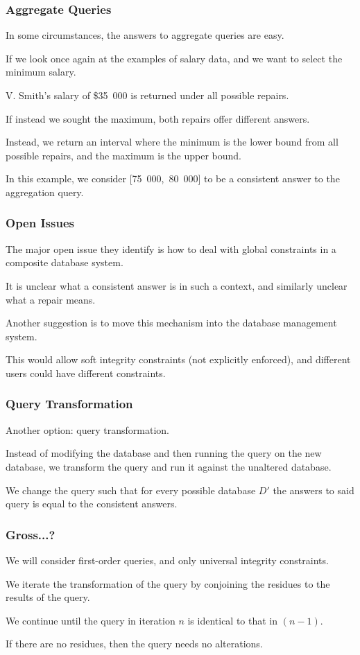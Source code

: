\begin{frame}
\frametitle{Aggregate Queries}

In some circumstances, the answers to aggregate queries are easy. 

If we look once again at the examples of salary data, and we want to select the minimum salary. 

V. Smith's salary of \$35~000 is returned under all possible repairs. 

If instead we sought the maximum, both repairs offer different answers. 

Instead, we return an interval where the minimum is the lower bound from all possible repairs, and the maximum is the upper bound. 

In this example, we consider [75~000,~80~000] to be a consistent answer to the aggregation query.


\end{frame}

\begin{frame}
\frametitle{Open Issues}

The major open issue they identify is how to deal with global constraints in a composite database system. 

It is unclear what a consistent answer is in such a context, and similarly unclear what a repair means.

Another suggestion is to move this mechanism into the database management system. 

This would allow soft integrity constraints (not explicitly enforced), and different users could have different constraints.

\end{frame}

\begin{frame}
\frametitle{Query Transformation}

Another option: query transformation. 

Instead of modifying the database and then running the query on the new database, we transform the query and run it against the unaltered database. 

We change the query such that for every possible database $D'$ the answers to said query is equal to the consistent answers.


\end{frame}

\begin{frame}
\frametitle{Gross...?}

We will consider first-order queries, and only universal integrity constraints. 

We iterate the transformation of the query by conjoining the \alert{residues} to the results of the query. 

We continue until the query in iteration $n$ is identical to that in $(n-1)$.

If there are no residues, then the query needs no alterations.


\end{frame}

